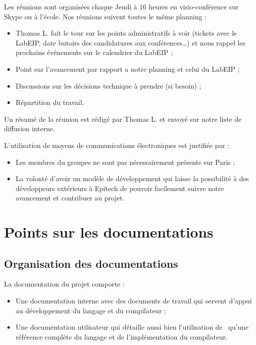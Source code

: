 \documentclass[francais]{rtxreport}
\begin{document}
Les réunions sont organisées chaque Jeudi à 16 heures en visio-conférence sur
Skype ou à l'école. Nos réunions suivent toutes le même planning :
\begin{itemize}
\item Thomas L. fait le tour sur les points administratifs à voir (tickets avec
  le LabEIP, date butoirs des candidatures aux conférences\ldots) et nous rappel
  les prochains événements sur le calendrier du LabEIP ;
\item Point sur l'avancement par rapport a notre planning et celui du LabEIP ;
\item Discussions sur les décisions technique à prendre (si besoin) ;
\item Répartition du travail.
\end{itemize}

Un résumé de la réunion est rédigé par Thomas L. et envoyé sur notre liste de
diffusion interne.

L'utilisation de moyens de communications électroniques est justifiée par :
\begin{itemize}
\item Les membres du groupes ne sont pas nécessairement présents sur Paris ;
\item La volonté d'avoir un modèle de développement qui laisse la possibilité à
  des développeurs extérieurs à Epitech de pouvoir facilement suivre notre
  avancement et contribuer au projet.
\end{itemize}

\chapter{Points sur les documentations}

\section{Organisation des documentations}

La documentation du projet comporte :
\begin{itemize}
\item Une documentation interne avec des documents de travail qui servent
  d'appui au développement du langage et du compilateur ;
\item Une documentation utilisateur qui détaille aussi bien l'utilisation de
  \rtx\ qu'une référence complète du langage et de l'implémentation du
  compilateur.
\end{itemize}
\end{document}
